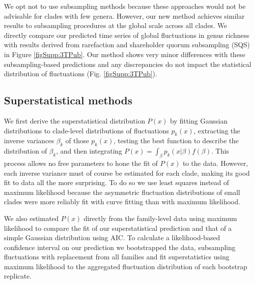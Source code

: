 \documentclass[12pt]{article}
\let\citep=\cite
\begin{document}
We opt not to use subsampling methods \citep{miller1996, alroy2010,
  kocsis2018} because these approaches would not be advisable for
clades with few genera. However, our new method achieves similar
results to subsampling procedures at the global scale across all
clades. We directly compare our predicted time series of global
fluctuations in genus richness with results derived from rarefaction
and shareholder quorum subsampling (SQS) in Figure
\ref{figSupp:3TPub}.  Our method shows very minor differences with
these subsampling-based predictions and any discrepancies do not
impact the statistical distribution of fluctuations
(Fig. \ref{figSupp:3TPub}).


\subsection{Superstatistical methods} \label{sec:numMeth}

We first derive the superstatistical distribution $P(x)$ by fitting
Gaussian distributions to clade-level distributions of fluctuations
$p_k(x)$, extracting the inverse variances $\beta_k$ of those
$p_k(x)$, testing the best function to describe the distribution of
$\beta_k$, and then integrating
$P(x) = \int_{\beta}p_k(x | \beta) f(\beta)$. This process allows no
free parameters to hone the fit of $P(x)$ to the data.  However, each
inverse variance must of course be estimated for each clade, making
its good fit to data all the more surprising.  To do so we use least
squares instead of maximum likelihood because the asymmetric
fluctuation distributions of small clades were more reliably fit with
curve fitting than with maximum likelihood.

We also estimated $P(x)$ directly from the family-level data using
maximum likelihood to compare the fit of our superstatistical
prediction and that of a simple Gaussian distribution using AIC. To
calculate a likelihood-based confidence interval on our prediction we
bootstrapped the data, subsampling fluctuations with replacement from
all families and fit superstatistics using maximum likelihood to the
aggregated fluctuation distribution of each bootstrap replicate.



\end{document}
